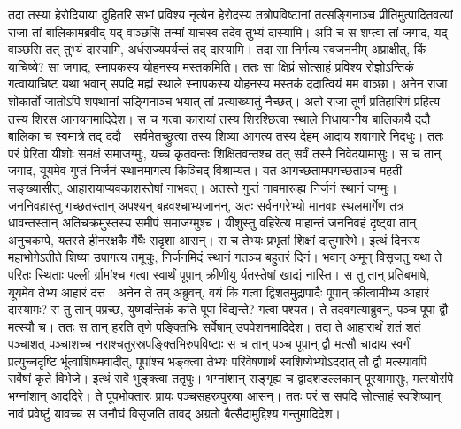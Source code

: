 \vakya तदा तस्या हेरोदियाया दुहितरि सभां प्रविश्य नृत्येन हेरोदस्य तत्रोपविष्टानां तत्सङ्गिनाञ्च प्रीतिमुत्पादितवत्यां राजा तां बालिकामब्रवीद् यद् वाञ्छसि तन्मां याचस्व तदेव तुभ्यं दास्यामि।
\vakya अपि च स शप्त्वा तां जगाद, यद् वाञ्छसि तत् तुभ्यं दास्यामि, अर्धराज्यपर्यन्तं तद् दास्यामि।
\vakya तदा सा निर्गत्य स्वजननीम् अप्राक्षीत्, किं याचिष्ये? सा जगाद, स्नापकस्य योहनस्य मस्तकमिति।
\vakya ततः सा क्षिप्रं सोत्साहं प्रविश्य रोज्ञोऽन्तिकं गत्वायाचिष्ट यथा भवान् सपदि मह्यं स्थाले स्नापकस्य योहनस्य मस्तकं ददात्वियं मम वाञ्छा।
\vakya अनेन राजा शोकार्तो जातोऽपि शपथानां सङ्गिनाञ्च भयात् तां प्रत्याख्यातुं नैच्छत्।
\vakya अतो राजा तूर्णं प्रतिहारिणं प्रहित्य तस्य शिरस आनयनमादिदेश।
\vakya स च गत्वा कारायां तस्य शिरश्छित्वा स्थाले निधायानीय बालिकायै ददौ बालिका च स्वमात्रे तद् ददौ। सर्वमेतच्छ्रुत्वा तस्य शिष्या आगत्य तस्य देहम् आदाय शवागारे निदधुः।
\vakya ततः परं प्रेरिता यीशोः समक्षं समाजग्मुः, यच्च कृतवन्तः शिक्षितवन्तश्च तत् सर्वं तस्मै निवेदयामासुः।
\vakya स च तान् जगाद, यूयमेव गुप्तं निर्जनं स्थानमागत्य किञ्चिद् विश्राम्यत।
\vakya यत आगच्छतामपगच्छताञ्च महती सङ्ख्यासीत्, आहारायाप्यवकाशस्तेषां नाभवत्।
\vakya अतस्ते गुप्तं नावमारूह्य निर्जनं स्थानं जग्मुः।
\vakya जननिवहास्तु गच्छतस्तान् अपश्यन् बहवश्चाभ्यजानन्, अतः सर्वनगरेभ्यो मानवाः स्थलमार्गेण तत्र धावन्तस्तान् अतिचक्रमुस्तस्य समीपं समाजग्मुश्च।
\vakya यीशुस्तु वहिरेत्य माहान्तं जननिवहं दृष्ट्वा तान् अनुचकम्पे, यतस्ते हीनरक्षकै र्मेषैः सदृशा आसन्। स च तेभ्यः प्रभृतां शिक्षां दातुमारेभे।
\vakya इत्थं दिनस्य महाभोगेऽतीते शिष्या उपागत्य तमूचुः, निर्जनमिदं स्थानं गतञ्च बहुतरं दिनं।
\vakya भवान् अमून् विसृजतु यथा ते परितः स्थिताः पल्ली र्ग्रामांश्च गत्वा स्वार्थं पूपान् क्रीणीयु र्यतस्तेषां खाद्यं नास्ति।
\vakya स तु तान् प्रतिबभाषे, यूयमेव तेभ्य आहारं दत्त। अनेन ते तम् अब्रुवन्, वयं किं गत्वा द्विशतमुद्रापादैः पूपान् क्रीत्वामीभ्य आहारं दास्यामः?
\vakya स तु तान् पप्रच्छ, युष्मदन्तिकं कति पूपा विद्यन्ते? गत्वा पश्यत। ते तदवगत्याब्रुवन्, पञ्च पूपा द्वौ मत्स्यौ च।
\vakya ततः स तान् हरति तृणे पङ्क्तिभिः सर्वेषाम् उपवेशनमादिदेश।
\vakya तदा ते आहारार्थं शतं शतं पञ्चाशत् पञ्चाशच्च नराश्चतुरस्रपङ्क्तिभिरुपविष्टाः
\vakya स च तान् पञ्च पूपान् द्वौ मत्सौ चादाय स्वर्गं प्रत्युच्चदृष्टि र्भूत्वाशिषमवादीत्, पूपांश्च भङ्क्त्वा तेभ्यः परिवेषणार्थं स्वशिष्येभ्योऽददात् तौ द्वौ मत्स्यावपि सर्वेषां कृते विभेजे।
\vakya इत्थं सर्वे भुङ्क्त्वा ततृपुः।
\vakya भग्नांशान् सङ्गृह्य च द्वादशडल्लकान् पूरयामासुः, मत्स्योरपि भग्नांशान् आददिरे।
\vakya ते पूपभोक्तारः प्रायः पञ्चसहस्रपुरुषा आसन्।
\vakya ततः परं स सपदि सोत्साहं स्वशिष्यान् नावं प्रवेष्टुं यावच्च स जनौघं विसृजति तावद् अग्रतो बैत्सैदामुद्दिश्य गन्तुमादिदेश।
